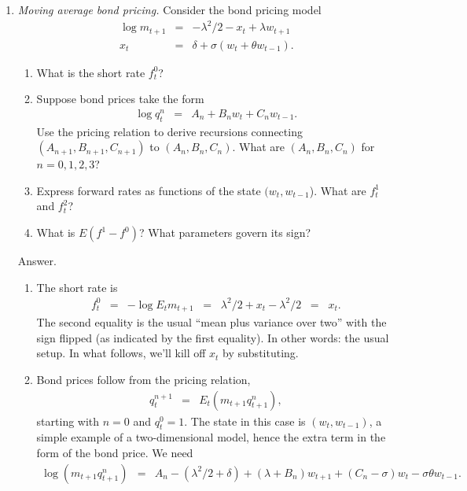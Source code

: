 \documentclass[11pt]{article}
\begin{document}
\begin{enumerate}
\item {\it Moving average bond pricing.\/}
Consider the bond pricing model
\begin{eqnarray*}
    \log m_{t+1} &=& - \lambda^2/2 - x_t + \lambda w_{t+1} \\
    x_t &=& \delta + \sigma (w_t + \theta w_{t-1}) .
\end{eqnarray*}

\begin{enumerate}
\item What is the short rate $f^0_t$?
\item Suppose bond prices take the form
\begin{eqnarray*}
    \log q^n_{t} &=& A_n + B_n w_t + C_n w_{t-1} .
\end{eqnarray*}
Use the pricing relation to derive recursions connecting
$(A_{n+1}, B_{n+1}, C_{n+1})$ to $(A_{n}, B_{n}, C_{n})$.
What are $(A_{n}, B_{n}, C_{n})$ for $n=0,1,2,3$?
\item Express forward rates as functions of the state $(w_t,w_{t-1}$).
What are $f^1_t$ and $f^2_t$?
\item What is $E(f^1- f^0)$?  What parameters govern its sign?
\end{enumerate}
%
Answer.
\begin{enumerate}
\item The short rate is
\begin{eqnarray*}
    f^0_t &=& - \log E_t m_{t+1} \;\;=\;\;  \lambda^2/2 + x_t - \lambda^2/2
            \;\;=\;\; x_t .
\end{eqnarray*}
The second equality is the usual ``mean plus variance over two'' with the sign flipped
(as indicated by the first equality).
In other words:  the usual setup.
In what follows, we'll kill off $x_t$ by substituting.
\item
Bond prices follow from the pricing relation,
\begin{eqnarray*}
    q_t^{n+1} &=& E_t (m_{t+1} q_{t+1}^n) ,
\end{eqnarray*}
starting with $n=0$ and  $q^0_t = 1$.
The state in this case is $(w_t, w_{t-1})$, a simple example of a
two-dimensional model, hence the extra term in the form of the bond price.
We need
\begin{eqnarray*}
    \log (m_{t+1} q_{t+1}^n) &=&
            A_n - (\lambda^2/2 + \delta) + (\lambda+B_n) w_{t+1}
            + (C_n-\sigma) w_t - \sigma \theta w_{t-1} .
\end{eqnarray*}

\end{enumerate}
\end{enumerate}
\end{document}
